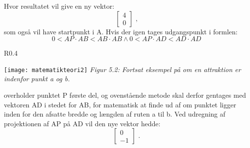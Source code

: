 Hvor resultatet vil give en ny vektor: \[ \begin{bmatrix} 4 \\ 0 \end{bmatrix} \text{ ,} \]  som også vil have startpunkt i A. Hvis der igen tages udgangspunkt i formlen:
\[0 < AP \cdot AB < AB \cdot AB \wedge 0 < AP \cdot AD < AD \cdot AD \]
\begin{wrapfigure}{R}{0.4\textwidth}
  \vspace{-20pt}
  \begin{center}
    \texttt{[image: matematikteori2]} \newline
    \textit{Figur 5.2: Fortsat eksempel på om en attraktion er indenfor punkt a og b.}\newline
  \end{center}
  \vspace{-20pt}
\end{wrapfigure}

overholder punktet P første del, og ovenstående metode skal derfor gentages med vektoren AD i stedet for AB, for matematisk at finde ud af om punktet ligger inden 	for den afsatte bredde og længden af ruten a til b. Ved udregning af projektionen af AP på AD vil den nye vektor hedde: \[ \begin{bmatrix} 0 \\ -1 \end{bmatrix} \text{ .} \]\newline